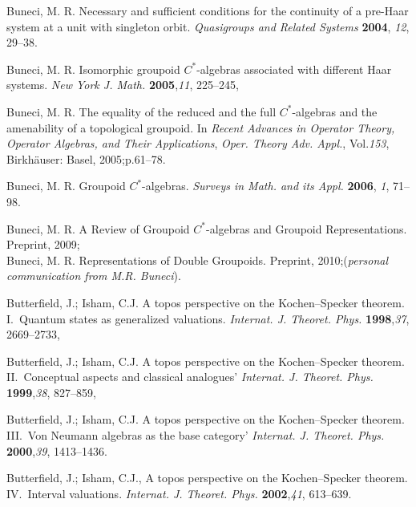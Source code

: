 \documentclass[12pt]{article}
\theoremstyle{plain}
\theoremstyle{definition}
\numberwithin{equation}{section}
\begin{document}
\begin{thebibliography}{199}
Buneci, M. R. Necessary and sufficient conditions for the continuity of a pre-Haar system at a unit with singleton orbit. {\em Quasigroups and Related Systems}  {\bf 2004}, {\em 12}, 29--38.

Buneci, M. R. Isomorphic groupoid $C^*$-algebras associated with different Haar systems. \textit{New York J. Math.}   {\bf 2005},{\em 11}, 225--245, %

Buneci, M. R. The equality of the reduced and the full $C^*$-algebras and the amenability of a topological groupoid.  In {\em Recent Advances in Operator Theory, Operator Algebras, and Their Applications}, \textit{Oper. Theory Adv. Appl.}, Vol.{\em 153}, Birkh\"auser: Basel, 2005;p.61--78.

Buneci, M. R.  Groupoid $C^*$-algebras. \textit{Surveys in Math. and its Appl.}   {\bf 2006}, {\em 1}, 71--98.

Buneci, M. R. A Review of Groupoid $C^*$-algebras and Groupoid Representations. Preprint, 2009;\\ 


Buneci, M. R. Representations of Double Groupoids.  Preprint, 2010;({\em personal communication from M.R. Buneci}).

Butterfield, J.; Isham, C.J.  A topos perspective on the Kochen--Specker theorem. I.~Quantum states as generalized valuations. \textit{Internat. J. Theoret. Phys.}
{\bf 1998},{\em 37},  2669--2733,


Butterfield, J.; Isham, C.J.  A topos perspective on the Kochen--Specker theorem. II.~Conceptual aspects and classical analogues' \textit{Internat. J. Theoret. Phys.}
{\bf 1999},{\em 38}, 827--859, 

Butterfield, J.; Isham, C.J.  A topos perspective on the Kochen--Specker theorem. III.~Von Neumann algebras as the base category' \textit{Internat. J. Theoret. Phys.}
{\bf 2000},{\em 39}, 1413--1436. 

Butterfield, J.; Isham, C.J., A topos perspective on the Kochen--Specker theorem. IV.~Interval valuations. \textit{Internat. J. Theoret. Phys.} {\bf 2002},{\em 41}, 613--639. 


\end{thebibliography}
\end{document}
